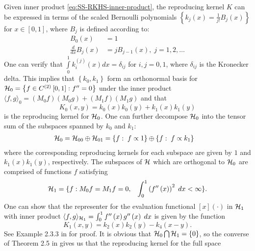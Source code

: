 Given inner product \eqref{eq:SS-RKHS-inner-product}, the reproducing kernel $K$ can be expressed in terms of the scaled Bernoulli polynomials $\left\{ k_j\left(x\right) = \frac{1}{j!}B_j\left(x\right) \right\}$ for $x \in \left[0,1\right]$, where $B_j$ is defined according to:
\begin{align*}
B_0\left(x\right) &= 1\\
\frac{d}{dx} B_j\left(x\right) &= jB_{j-1}\left(x\right), \;j = 1, 2, \dots
\end{align*}
\noindent
One can verify that $\int \limits_0^1 k_i^{\left(j\right)}\left(x \right)dx = \delta_{ij}$ for $i,j= 0,1$, where $\delta_{ij}$ is the Kronecker delta. This implies that  $\left\{k_0, k_1\right\}$ form an orthonormal basis for $\mathcal{H}_{0} = \left\{ f \in C^{\left(2\right)}\left[0,1\right]: f'' = 0 \right\}$ under the inner product $\langle f,g\rangle_0 =  \left(M_0 f \right)\left(M_0 g\right) + \left(M_1 f\right) \left(M_1 g\right)$ and that 
\[
K_{0}\left(x,y\right) =  k_0\left(x\right)  k_0\left(y\right) +  k_1\left(x\right)  k_1\left(y\right) 
\]
\noindent
is the reproducing kernel for $\mathcal{H}_{0}$. One can further decompose $\mathcal{H}_0$ into the tensor sum of the subspaces spanned by $k_0$ and $k_1$:
\begin{align}\label{eq:SS-RKHS-null-space-tensor-sum}
\mathcal{H}_0 &=  \mathcal{H}_{00} \oplus \mathcal{H}_{01}= \left\{f: \;f \propto 1 \right\} \oplus \left\{f: \;f \propto k_1\right\}
\end{align}
\noindent
where the corresponding reproducing kernels for each subspace are given by $1$ and $k_1\left(x\right)k_1\left(y\right)$, respectively. The subspaces of $\mathcal{H}$ which are orthogonal to $\mathcal{H}_0$ are comprised of functions $f$ satisfying 
\[
\hilbert_{1} = \lbrace f: M_0 f = M_1 f =  0,\;\;\;\int_{0}^1 \left(f''\left(x\right)\right)^2\;dx < \infty \rbrace. %
\]
One can show that the representer for the evaluation functional $\left[x\right] \left(\cdot\right)$ in $\mathcal{H}_{1}$ with inner product $\langle f,g\rangle_{\mathcal{H}_1}= \int_0^1 f''\left(x\right)g''\left(x\right)\;dx$ is given by the function
\begin{equation}
{{K }_{1}}\left(x,y\right) = k_{2}\left(x\right)k_{2}\left(y\right) - k_{4}\left(x-y \right).
\end{equation}
\noindent
See Example 2.3.3 in \cite{gu2002smoothing} for proof. It is obvious that $\mathcal{H}_0 \bigcap \mathcal{H}_1 = \left\{0\right\}$, so the converse of Theorem 2.5 in \cite{gu2013smoothing} gives us that the reproducing kernel for the full space
